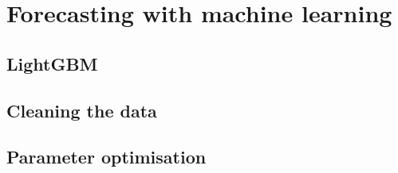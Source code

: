 \section{Forecasting with machine learning}

\subsection{LightGBM}

\subsection{Cleaning the data}

\subsection{Parameter optimisation}